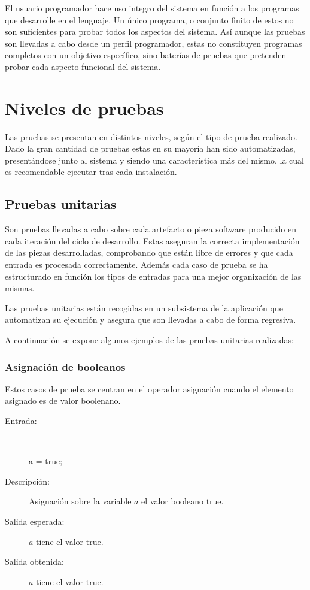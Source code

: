 El usuario programador hace uso integro del sistema en función a los programas que desarrolle en el lenguaje. Un único programa, o conjunto finito de estos no 
son suficientes para probar todos los aspectos del sistema. Así aunque las pruebas son llevadas a cabo desde un perfil programador, estas no constituyen programas 
completos con un objetivo específico, sino baterías de pruebas que pretenden probar cada aspecto funcional del sistema. 

\section{Niveles de pruebas}
Las pruebas se presentan en distintos niveles, según el tipo de prueba realizado. Dado la gran cantidad de pruebas estas en su mayoría han sido automatizadas, presentándose
junto al sistema y siendo una característica más del mismo, la cual es recomendable ejecutar tras cada instalación. 

\subsection{Pruebas unitarias}
Son pruebas llevadas a cabo sobre cada artefacto o pieza software producido en cada iteración del ciclo de desarrollo. Estas aseguran la correcta implementación
de las piezas desarrolladas, comprobando que están libre de errores y que cada entrada es procesada correctamente. Además cada caso de prueba se ha estructurado en función 
los tipos de entradas para una mejor organización de las mismas. 
 
Las pruebas unitarias están recogidas en un subsistema de la aplicación que automatizan su ejecución y asegura que son llevadas a cabo de forma regresiva. 

A continuación se expone algunos ejemplos de las pruebas unitarias realizadas:

\subsubsection{Asignación de booleanos}
Estos casos de prueba se centran en el operador asignación cuando el elemento asignado es de valor boolenano.

	\begin{description}
		\item [Entrada:]\hfill \\
\begin{myverbatim}
 a = true;
\end{myverbatim}
		\item [Descripción:] Asignación sobre la variable $a$ el valor booleano true.
		\item [Salida esperada:] $a$ tiene el valor true.
		\item [Salida obtenida:] $a$ tiene el valor true.
	\end{description}

